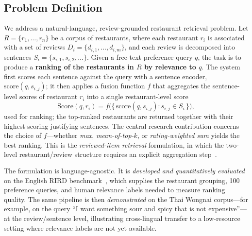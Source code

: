 \documentclass[10pt,twocolumn]{article}
\begin{document}
\subsection{Problem Definition}
We address a natural-language, review-grounded restaurant retrieval problem. Let
$R = \{r_1, \dots, r_n\}$ be a corpus of restaurants, where each restaurant $r_i$ is
associated with a set of reviews $D_i = \{d_{i,1}, \dots, d_{i,m}\}$, and each review is
decomposed into sentences $S_i = \{s_{i,1}, s_{i,2}, \dots\}$. Given a free-text
preference query $q$, the task is to produce a \textbf{ranking of the restaurants in
$R$ by relevance to $q$}. The system first scores each sentence against the query with a
sentence encoder, $\mathrm{score}(q, s_{i,j})$; it then applies a fusion function $f$
that aggregates the sentence-level scores of restaurant $r_i$ into a single
restaurant-level score
\begin{equation}
  \mathrm{Score}(q, r_i) = f\big(\{\,\mathrm{score}(q, s_{i,j}) : s_{i,j} \in S_i\,\}\big),
\end{equation}
used for ranking; the top-ranked restaurants are returned together with their
highest-scoring justifying sentences. The central research contribution concerns the
choice of $f$---whether \emph{max}, \emph{mean-of-top-$k$}, or \emph{rating-weighted
sum} yields the best ranking. This is the \emph{reviewed-item retrieval} formulation, in
which the two-level restaurant/review structure requires an explicit aggregation
step~\cite{rird2023}.

The formulation is language-agnostic. It is \emph{developed and quantitatively
evaluated} on the English RIRD benchmark~\cite{rird2023}, which supplies the restaurant
grouping, 100 preference queries, and human relevance labels needed to measure ranking
quality. The same pipeline is then \emph{demonstrated} on the Thai Wongnai corpus---for
example, on the query ``I want something sour and spicy that is not expensive''---at the
review/sentence level, illustrating cross-lingual transfer to a low-resource setting
where relevance labels are not yet available.
\end{document}
